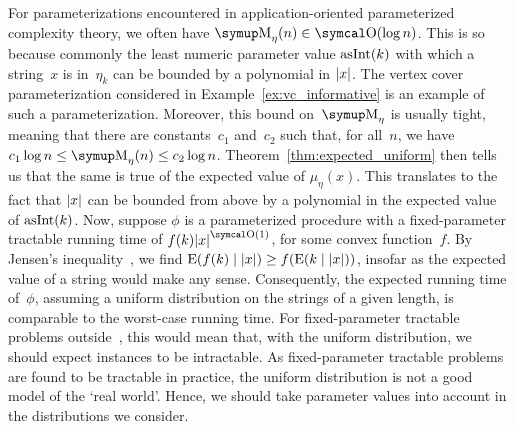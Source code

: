 For parameterizations encountered in application-oriented parameterized complexity theory, we often have $\upM_\eta(n) \in \bigO(\log n)$.
This is so because commonly the least numeric parameter value $\operatorname{asInt}(k)$ with which a string~$x$ is in~$\eta_k$ can be bounded by a polynomial in ${\lvert x\rvert}$.
The vertex cover parameterization considered in Example~\ref{ex:vc_informative} is an example of such a parameterization.
Moreover, this bound on~$\upM_\eta$ is usually tight, meaning that there are constants~$c_1$ and~$c_2$ such that, for all~$n$, we have $c_1 \log n \le \upM_\eta(n) \le c_2 \log n$.
Theorem~\ref{thm:expected_uniform} then tells us that the same is true of the expected value of $\mu_\eta(x)$.
This translates to the fact that ${\lvert x\rvert}$ can be bounded from above by a polynomial in the expected value of $\operatorname{asInt}(k)$.
Now, suppose $\phi$ is a parameterized procedure with a fixed-parameter tractable running time of $f(k)\length{x}^{\bigO(1)}$, for some convex function~$f$.
By Jensen's inequality~\parencite{cover2006elements}, we find $\operatorname*{E}(f(k) \mid {\lvert x\rvert}) \ge f(\operatorname*{E}(k \mid {\lvert x\rvert}))$, insofar as the expected value of a string would make any sense.
Consequently, the expected running time of~$\phi$, assuming a uniform distribution on the strings of a given length, is comparable to the worst-case running time.
For fixed-parameter tractable problems outside~, this would mean that, with the uniform distribution, we should expect instances to be intractable.
As fixed-parameter tractable problems are found to be tractable in practice, the uniform distribution is not a good model of the \enquote*{real world}.
Hence, we should take parameter values into account in the distributions we consider.

